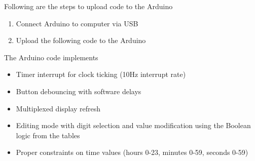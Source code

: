 Following are the steps to upload code to the Arduino
\begin{enumerate}
    \item Connect Arduino to computer via USB
    \item Upload the following code to the Arduino 
\end{enumerate}
The Arduino code implements
\begin{itemize}
    \item Timer interrupt for clock ticking (10Hz interrupt rate)
    \item Button debouncing with software delays
    \item Multiplexed display refresh
    \item Editing mode with digit selection and value modification using the Boolean logic from the tables
    \item Proper constraints on time values (hours 0-23, minutes 0-59, seconds 0-59)
\end{itemize}
